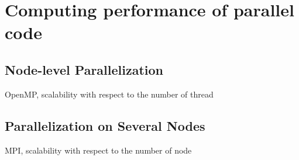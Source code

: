 
\chapter{Computing performance of parallel code\label{chpt:parallelization}}

\section{Node-level Parallelization}

OpenMP, scalability with respect to the number of thread

\section{Parallelization on Several Nodes}

MPI, scalability with respect to the number of node
